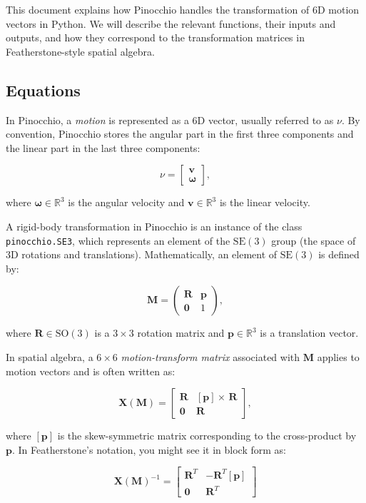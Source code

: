 \documentclass[10pt]{article}
\begin{document}
This document explains how Pinocchio handles the transformation of 6D motion vectors in Python. We will describe the relevant functions, their inputs and outputs, and how they correspond to the transformation matrices in Featherstone-style spatial algebra.

\subsection*{Equations}
In Pinocchio, a \emph{motion} is represented as a 6D vector, usually referred to as \( \nu \). By convention, Pinocchio stores the angular part in the first three components and the linear part in the last three components:

\[
\nu =
\begin{bmatrix}
\boldsymbol{v} \\
\boldsymbol{\omega}
\end{bmatrix},
\]

where \(\boldsymbol{\omega} \in \mathbb{R}^3\) is the angular velocity and \(\mathbf{v} \in \mathbb{R}^3\) is the linear velocity.

A rigid-body transformation in Pinocchio is an instance of the class \texttt{pinocchio.SE3}, which represents an element of the \(\mathrm{SE}(3)\) group (the space of 3D rotations and translations). Mathematically, an element of \(\mathrm{SE}(3)\) is defined by:

\[
\mathbf{M} =
\begin{pmatrix}
\mathbf{R} & \mathbf{p} \\
\mathbf{0} & 1
\end{pmatrix},
\]

where \(\mathbf{R} \in \mathrm{SO}(3)\) is a \(3\times3\) rotation matrix and \(\mathbf{p} \in \mathbb{R}^3\) is a translation vector.

In spatial algebra, a \(6\times6\) \emph{motion-transform matrix} associated with \(\mathbf{M}\) applies to motion vectors and is often written as:

\[
\mathbf{X}(\mathbf{M}) =
\begin{bmatrix}
\mathbf{R} & [\mathbf{p}] \times \, \mathbf{R} \\
\mathbf{0} & \mathbf{R}
\end{bmatrix},
\]

where \([\mathbf{p}]\) is the skew-symmetric matrix corresponding to the cross-product by \(\mathbf{p}\). In Featherstone's notation, you might see it in block form as:

\[
\mathbf{X}(\mathbf{M})^{-1} =
\begin{bmatrix}
\mathbf{R}^{T} & -\mathbf{R}^T [\mathbf{p}] \\
\mathbf{0} & \mathbf{R}^{T}
\end{bmatrix}
\]
\end{document}
